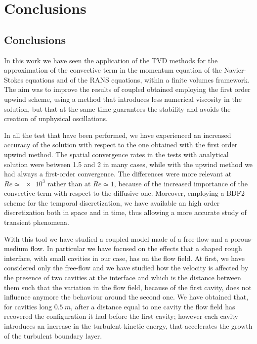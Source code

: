 \chapter{Conclusions}
\section{Conclusions}
In this work we have seen the application of the TVD methods for the 
approximation of the convective term in the momentum equation of the 
Navier-Stokes equations and of the RANS equations, within a finite volumes 
framework. The aim was to improve the results of coupled obtained employing the 
first order upwind scheme, using a method that introduces less numerical 
viscosity in the solution, but that at the same time guarantees the stability 
and avoids the creation of unphysical oscillations.

In all the test that have been performed, we have experienced an increased 
accuracy of the solution with respect to the one obtained with the first order 
upwind method. The spatial convergence rates in the tests with analytical 
solution were between 1.5 and 2 in many cases, while with the upwind method we had always a first-order convergence. 
The differences were more relevant at $Re\simeq\num{e3}$ rather than at 
$Re\simeq1$, because of the increased importance of the convective term with 
respect to the diffusive one. Moreover, employing a BDF2 scheme for the 
temporal discretization, we have available an high order discretization both 
in 
space and in time, thus allowing a more accurate study of transient phenomena. 

With this tool we have studied a coupled model made of a free-flow and a 
porous-medium flow. In particular we have focused on the effects that a shaped rough
interface, with small cavities in our case, has on the flow field.
At first, we have considered only the free-flow and we have studied how the 
velocity is affected by the presence of two cavities at the interface and 
which is the distance between them such that the variation in the flow field, 
because of the first cavity, does not influence anymore the behaviour around 
the 
second one. We have obtained that, for cavities long $\SI{0.5}{m}$, after a 
distance equal to one cavity the flow field has recovered the configuration it 
had before the first cavity; however each cavity introduces an increase in the 
turbulent kinetic energy, that accelerates the growth of the turbulent 
boundary layer.

